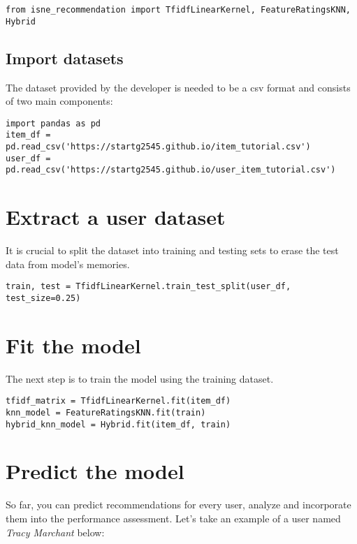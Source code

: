 \begin{verbatim}
from isne_recommendation import TfidfLinearKernel, FeatureRatingsKNN, Hybrid
\end{verbatim}

\subsection{Import datasets}

The dataset provided by the developer is needed to be a csv format and consists of two main components:

\begin{verbatim}
import pandas as pd
item_df = pd.read_csv('https://startg2545.github.io/item_tutorial.csv')
user_df = pd.read_csv('https://startg2545.github.io/user_item_tutorial.csv')
\end{verbatim}

\section{Extract a user dataset}

It is crucial to split the dataset into training and testing sets to erase the 
test data from model's memories.

\begin{verbatim}
train, test = TfidfLinearKernel.train_test_split(user_df, test_size=0.25)
\end{verbatim}

\section{Fit the model}

The next step is to train the model using the training dataset.

\begin{verbatim}
tfidf_matrix = TfidfLinearKernel.fit(item_df)
knn_model = FeatureRatingsKNN.fit(train)
hybrid_knn_model = Hybrid.fit(item_df, train)
\end{verbatim}

\section{Predict the model}

So far, you can predict recommendations for every user, analyze and 
incorporate them into the performance assessment. 
Let's take an example of a user named \textit{Tracy Marchant} below:

